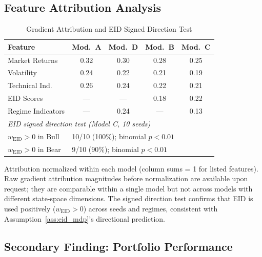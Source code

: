 \documentclass[12pt]{article}
\begin{document}
\subsection{Feature Attribution Analysis}

\begin{table}[H]
\centering
\caption{Gradient Attribution and EID Signed Direction Test}
\label{tab:feature_importance}
\small
\begin{tabular}{lcccc}
\toprule
Feature & Mod.\ A & Mod.\ D & Mod.\ B & Mod.\ C \\
\midrule
Market Returns & 0.32 & 0.30 & 0.28 & 0.25 \\
Volatility & 0.24 & 0.22 & 0.21 & 0.19 \\
Technical Ind. & 0.26 & 0.24 & 0.22 & 0.21 \\
EID Scores & --- & --- & 0.18 & 0.22 \\
Regime Indicators & --- & 0.24 & --- & 0.13 \\
\midrule
\multicolumn{5}{l}{\textit{EID signed direction test (Model C, 10 seeds)}} \\
\hspace{4pt}$w_{\mathrm{EID}}>0$ in Bull & \multicolumn{4}{l}{10/10 (100\%); binomial $p<0.01$} \\
\hspace{4pt}$w_{\mathrm{EID}}>0$ in Bear & \multicolumn{4}{l}{9/10 (90\%); binomial $p<0.01$} \\
\bottomrule
\end{tabular}
\begin{tablenotes}
\footnotesize
\item Attribution normalized within each model (column sums = 1 for
listed features). Raw gradient attribution magnitudes before normalization
are available upon request; they are comparable within a single model but
not across models with different state-space dimensions. The signed
direction test confirms that EID is used positively ($w_{\mathrm{EID}}>0$)
across seeds and regimes, consistent with Assumption~\ref{ass:eid_mdp}'s
directional prediction.
\end{tablenotes}
\end{table}

\subsection{Secondary Finding: Portfolio Performance}
\label{sec:performance}
\end{document}

